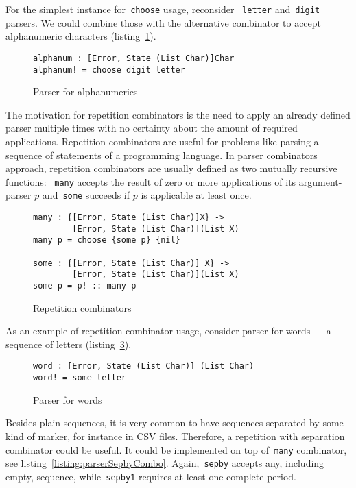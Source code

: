     For the simplest instance for~\texttt{choose} usage, reconsider
    ~\texttt{letter} and~\texttt{digit} parsers. We could combine those with the
    alternative combinator to accept alphanumeric characters
    (listing~\ref{listing:parserAlphanumCombo}).

    \begin{figure}[h]
    \begin{lstlisting}
alphanum : [Error, State (List Char)]Char
alphanum! = choose digit letter
    \end{lstlisting}
    \caption{Parser for alphanumerics}
    \label{listing:parserAlphanumCombo}
    \end{figure}

    The motivation for repetition combinators is the need to apply an already defined
    parser multiple times with no certainty about the amount of required applications.
    Repetition combinators are useful for problems like parsing a sequence
    of statements of a programming language. In parser combinators approach,
    repetition combinators are usually defined as two mutually recursive functions:
    ~\texttt{many} accepts the result of zero or more applications of its
    argument-parser $p$ and~\texttt{some} succeeds if $p$ is applicable at least
    once.

    \begin{figure}[h]
    \begin{lstlisting}
many : {[Error, State (List Char)]X} ->
        [Error, State (List Char)](List X)
many p = choose {some p} {nil}

some : {[Error, State (List Char)] X} ->
        [Error, State (List Char)](List X)
some p = p! :: many p
    \end{lstlisting}
    \caption{Repetition combinators}
    \label{listing:parserManyCombo}
    \end{figure}

    As an example of repetition combinator usage, consider parser for words ---
    a sequence of letters (listing~\ref{listing:parserWordCombo}).

    \begin{figure}[h]
    \begin{lstlisting}
word : [Error, State (List Char)] (List Char)
word! = some letter
    \end{lstlisting}
    \caption{Parser for words}
    \label{listing:parserWordCombo}
    \end{figure}

    Besides plain sequences, it is very common to have sequences separated by some
    kind of marker, for instance in CSV files. Therefore, a repetition with separation
    combinator could be useful. It could be implemented on top of~\texttt{many}
    combinator, see listing~\ref{listing:parserSepbyCombo}. Again,~\texttt{sepby}
    accepts any, including empty, sequence, while~\texttt{sepby1} requires at least
    one complete period.

